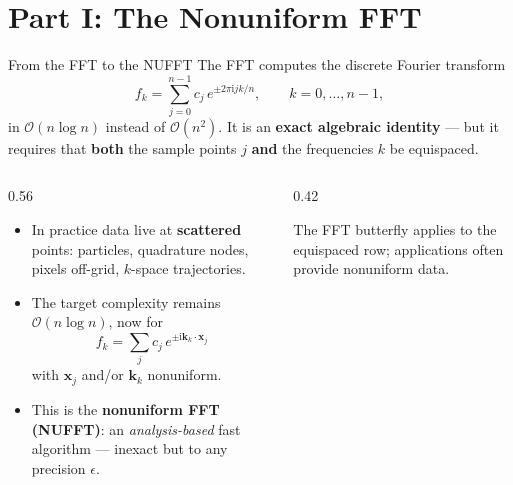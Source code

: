 \documentclass[aspectratio=169,11pt]{beamer}
\newcommand{\cO}{\mathcal{O}}
\newcommand{\ii}{\mathrm i}
\newcommand{\x}{\bm{x}}
\newcommand{\kk}{\bm{k}}
\newcommand{\hl}[1]{{\color{CCMorange}\textbf{#1}}}
\begin{document}
\section{Part I: The Nonuniform FFT}

\begin{frame}{From the FFT to the NUFFT}
\footnotesize
The FFT computes the discrete Fourier transform
\[
  f_k=\sum_{j=0}^{n-1} c_j\, e^{\pm 2\pi \ii jk/n},\qquad k=0,\dots,n-1,
\]
in \(\cO(n\log n)\) instead of \(\cO(n^2)\).  It is an \hl{exact algebraic identity} --- but it requires that
\hl{both} the sample points \(j\) \hl{and} the frequencies \(k\) be equispaced.
\begin{columns}[T,totalwidth=\textwidth]
\begin{column}{0.56\textwidth}
\begin{itemize}
  \item In practice data live at \hl{scattered} points: particles, quadrature nodes, pixels off-grid, $k$-space trajectories.
  \item The target complexity remains \(\cO(n\log n)\), now for
  \[
    f_k=\sum_j c_j\, e^{\pm \ii \kk_k\cdot \x_j}
  \]
  with \(\x_j\) and/or \(\kk_k\) nonuniform.
  \item This is the \hl{nonuniform FFT (NUFFT)}: an \emph{analysis-based} fast algorithm --- inexact but to any precision \(\epsilon\).
\end{itemize}
\end{column}
\begin{column}{0.42\textwidth}
\centering
{}

\vspace{2mm}
{\scriptsize The FFT butterfly applies to the equispaced row; applications often provide nonuniform data.}
\end{column}
\end{columns}
\end{frame}
\end{document}
